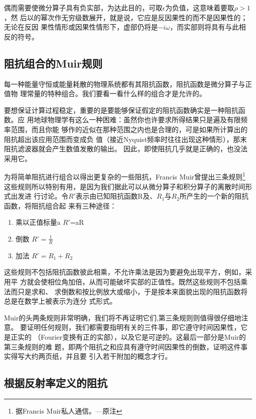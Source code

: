偶而需要使微分算子具有负实部，为达此目的，可取$\epsilon$为负值，这意味着要取$\rho>1$，然
后以的幂次作无穷级数展开，就是说，它应是反因果性的而不是因果性的；无论在反因
果性情形或因果性情形下，虚部仍将是$-i\omega$，而实部则将具有与此相反的符号。


\subsection{阻抗组合的Muir规则}
\label{sec:4.6.5}

每一种能量守恒或能量耗散的物理系统都有其阻抗函数，阻抗函数是微分算子与正值物
理常量的特种组合。我们要看一看什么样的组合才是允许的。

要想保证计算过程稳定，重要的是要能够保证假定的阻抗函数确实是一种阻抗函数。应
用地球物理学有这么一种困难：虽然你也许要求所得结果只是遍及有限频率范围，而且你能
够作的近似在那种范围之内也是合理的，可是如果所计算出的阻抗超出该应用范围而变成负
值（接近Nyquist频率时往往出现这种情形），那末阻抗滤波器就会产生数值发散的输出。
因此，即使阻抗几乎就是正确的，也没法采用它。

为将简单阻抗进行组合以得出更复杂的一些阻抗，Francis Muir曾提出三条规则\footnote{
据Francis Muir私人通信。---原注}
这些规则所以特别有用，是因为我们据此可以从微分算子和积分算子的离散时间形式出发进
行讨论。令$R'$表示由已知阻抗函数R及、$R_1$与$R_2$所产生的一个新的阻抗函数，将阻抗组合起
来有三种途径：
\begin{enumerate}
\item 乘以正值标量a $R'$=aR
\item 倒数         $R'=\frac{1}{R}$
\item 加法         $R'=R_1+R_2$
\end{enumerate}

这些规则不包括阻抗函数彼此相乘，不允许乘法是因为要避免出现平方，例如，采用平
方就会使相位角加倍，从而可能破坏实部的正值性。既然这些规则不包括乘法而只是求和、
求倒数和按比例放大或缩小，于是按本来面貌出现的阻抗函数将总是在数学上被表示为连分
式形式。

Muir的头两条规则非常明确，我们将不再证明它们,第三条规则则值得很仔细地注意。
要证明任何规则，我们都需要指明有关的三件事，即它遵守时间因果性，它是正实的
（Fourier变换有正的实部），以及它是可逆的。这最后一部分是Muir的第三条规则的难
题，即两个阻抗之和应具有遵守时间因果性的倒数，证明这件事实得写大约两页纸，并且要
引入若干附加的概念才行。

\subsection{根据反射率定义的阻抗}
\label{sec:4.6.6}

